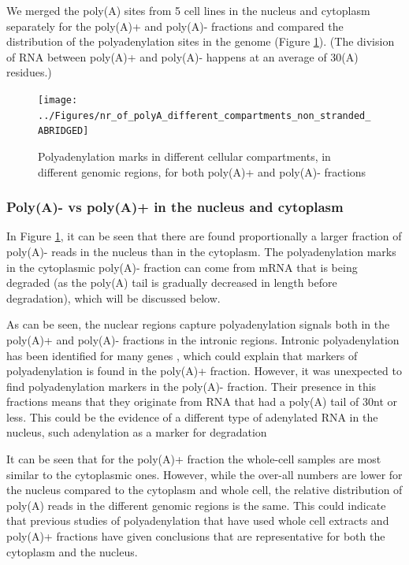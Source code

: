 \documentclass[a4paper]{article}
\begin{document}
We merged the poly(A) sites from 5 cell lines in the nucleus and cytoplasm
separately for the poly(A)+ and poly(A)- fractions and compared the
distribution of the polyadenylation sites in the genome (Figure
\ref{fig:region_counts}). (The division of RNA between poly(A)+ and poly(A)-
happens at an average of 30(A) residues.)
\begin{figure}[h]
	\centering
		\texttt{[image: ../Figures/nr\_of\_polyA\_different\_compartments\_non\_stranded\_ABRIDGED]}
	\caption{Polyadenylation marks in different cellular compartments, in
	different genomic regions, for both poly(A)+ and poly(A)- fractions}
	\label{fig:region_counts}
\end{figure}
\subsubsection{Poly(A)- vs poly(A)+ in the nucleus and cytoplasm}
In Figure \ref{fig:region_counts}, it can be seen that there are found
proportionally a larger fraction of poly(A)- reads in the nucleus than in the
cytoplasm. The polyadenylation marks in the cytoplasmic poly(A)- fraction can
come from mRNA that is being degraded (as the poly(A) tail is gradually
decreased in length before degradation), which will be discussed below.

As can be seen, the nuclear regions capture polyadenylation signals both in the
poly(A)+ and poly(A)- fractions in the intronic regions. Intronic
polyadenylation has been identified for many genes \cite{tian_widespread_2007},
which could explain that markers of polyadenylation is found in the poly(A)+
fraction.  However, it was unexpected to find polyadenylation markers in the
poly(A)- fraction. Their presence in this fractions means that they originate
from RNA that had a poly(A) tail of 30nt or less. This could be the
evidence of a different type of adenylated RNA in the nucleus, such adenylation
as a marker for degradation \cite{slomovic_addition_2010}

It can be seen that for the poly(A)+ fraction the whole-cell samples are most
similar to the cytoplasmic ones. However, while the over-all numbers are lower for
the nucleus compared to the cytoplasm and whole cell, the relative distribution of
poly(A) reads in the different genomic regions is the same. This could indicate that
previous studies of polyadenylation that have used whole cell extracts and
poly(A)+ fractions have given conclusions that are representative for both the
cytoplasm and the nucleus.
\end{document}
